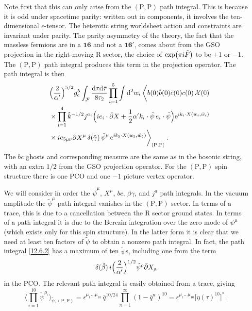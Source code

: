 Note first that this can only arise from the $(\mathrm{P},\mathrm{P})$ path integral. This is because it is odd under spacetime parity: written out in components, it involves the ten-dimensional $\epsilon$-tensor. The heterotic string worldsheet action and constraints are invariant under parity. The parity asymmetry of the theory, the fact that the massless fermions are in a $\mathbf{16}$ and not a $\mathbf{16}'$, comes about from the GSO projection in the right-moving R sector, the choice of $\exp(\pi i\tilde{F})$ to be $+1$ or $-1$. The $(\mathrm{P},\mathrm{P})$ path integral produces this term in the projection operator. The path integral is then
\begin{align}
	&\quad \Bigl(\frac{2}{\alpha'}\Bigr)^{5/2}g_{\mathrm{c}}^5 \int_{\mathcal{F}}\frac{\mathrm{d}\tau\mathrm{d}\bar{\tau}}{8\tau_2}\prod_{i=1}^{5}\int\mathrm{d}^2 w_i \:\biggl\langle b(0)\tilde{b}(0)\tilde{c}(0)c(0)\,\mathcal{X}(0) \nonumber \\
	&\quad \times \prod_{i=1}^{4}\hat{k}^{-1/2}j^{a_i}\Bigl(i e_i\cdot\bar{\partial}X + \frac{1}{2}\alpha' k_i\cdot\tilde{\psi}\,e_i\cdot\tilde{\psi}\Bigr)\mathrm{e}^{i k_i\cdot X(w_i,\bar{w}_i)} \nonumber \\
	&\quad \times i e_{5\mu\nu}\partial X^\mu\,\delta(\tilde{\gamma})\,\tilde{\psi}^\nu\,\mathrm{e}^{i k_5\cdot X(w_5,\bar{w}_5)}\biggr\rangle_{(\mathrm{P},\mathrm{P})} \:. \label{12.6.2}
\end{align}
The $bc$ ghosts and corresponding measure are the same as in the bosonic string, with an extra $1/2$ from the GSO projection operator. For the $(\mathrm{P},\mathrm{P})$ spin structure there is one PCO and one $-1$ picture vertex operator.

We will consider in order the $\tilde{\psi}^\mu$, $X^\mu$, $bc$, $\beta\gamma$, and $j^a$ path integrals. In the vacuum amplitude the $\tilde{\psi}^\mu$ path integral vanishes in the $(\mathrm{P},\mathrm{P})$ sector. In terms of a trace, this is due to a cancellation between the R sector ground states. In terms of a path integral it is due to the Berezin integration over the zero mode of $\psi^\mu$ (which exists only for this spin structure). In the latter form it is clear that we need at least ten factors of $\tilde{\psi}$ to obtain a nonzero path integral. In fact, the path integral \eqref{12.6.2} has a maximum of ten $\tilde{\psi}$s, including one from the term
\begin{equation}
	\delta(\tilde{\beta})\,i\Bigl(\frac{2}{\alpha'}\Bigr)^{1/2}\tilde{\psi}^\rho\bar{\partial}X_\rho \label{12.6.3}
\end{equation}
in the PCO. The relevant path integral is easily obtained from a trace, giving
\begin{equation}
	\biggl\langle \prod_{i=1}^{10}\tilde{\psi}^{\mu_i}\biggr\rangle_{\tilde{\psi},(\mathrm{P},\mathrm{P})} = \epsilon^{\mu_1\dots\mu_{10}}\,\bar{q}^{10/24}\prod_{n=1}^{\infty}(1-\bar{q}^n)^{10} = \epsilon^{\mu_1\dots\mu_{10}}\bigl[\eta(\tau)^{10}\bigr]^* \:. \label{12.6.4}
\end{equation}

